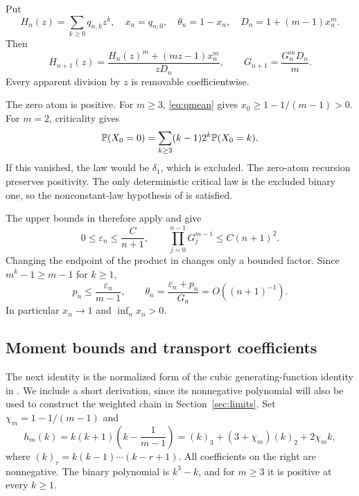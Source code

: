 \documentclass[11pt,letterpaper,reqno]{amsart}
\theoremstyle{plain}
\begin{document}
Put
\[
 H_n(z)=\sum_{k\ge0}q_{n,k}z^k,\quad x_n=q_{n,0},\quad
 \theta_n=1-x_n,\quad D_n=1+(m-1)x_n^m.
\]
Then
\begin{equation}\label{eq:tilt}
 H_{n+1}(z)=\frac{H_n(z)^m+(mz-1)x_n^m}{zD_n},\qquad
 G_{n+1}=\frac{G_n^mD_n}{m}.
\end{equation}
Every apparent division by $z$ is removable coefficientwise.

The zero atom is positive. For $m\ge3$, \eqref{eq:qmean} gives $x_0\ge1-1/(m-1)>0$. For $m=2$, criticality gives
\[
 \mathbb P(X_0=0)=\sum_{k\ge2}(k-1)2^k\mathbb P(X_0=k).
\]
If this vanished, the law would be $\delta_1$, which is excluded. The zero-atom recursion preserves positivity. The only deterministic critical law is the excluded binary one, so the nonconstant-law hypothesis of \cite{CDHLS} is satisfied.

The upper bounds in \cite[Theorem~3 and Proposition~1]{CDHLS} therefore apply and give
\begin{equation}\label{eq:coarse}
 0\le\varepsilon_n\le\frac C{n+1},\qquad
 \prod_{j=0}^{n-1}G_j^{m-1}\le C(n+1)^2.
\end{equation}
Changing the endpoint of the product in \cite{CDHLS} changes only a bounded factor. Since $m^k-1\ge m-1$ for $k\ge1$,
\begin{equation}\label{eq:theta}
 p_n\le\frac{\varepsilon_n}{m-1},\qquad
 \theta_n=\frac{\varepsilon_n+p_n}{G_n}=O((n+1)^{-1}).
\end{equation}
In particular $x_n\to1$ and $\inf_n x_n>0$.

\subsection{Moment bounds and transport coefficients}
The next identity is the normalized form of the cubic generating-function identity in \cite[eqs.~(18)--(19)]{CDHLS}. We include a short derivation, since its nonnegative polynomial will also be used to construct the weighted chain in Section~\ref{sec:limits}. Set $\chi_m=1-1/(m-1)$ and
\begin{equation}\label{eq:cubic}
 h_m(k)=k(k+1)\left(k-\frac1{m-1}\right)
 =(k)_3+(3+\chi_m)(k)_2+2\chi_m k,
\end{equation}
where $(k)_r=k(k-1)\cdots(k-r+1)$. All coefficients on the right are nonnegative. The binary polynomial is $k^3-k$, and for $m\ge3$ it is positive at every $k\ge1$.
\end{document}
